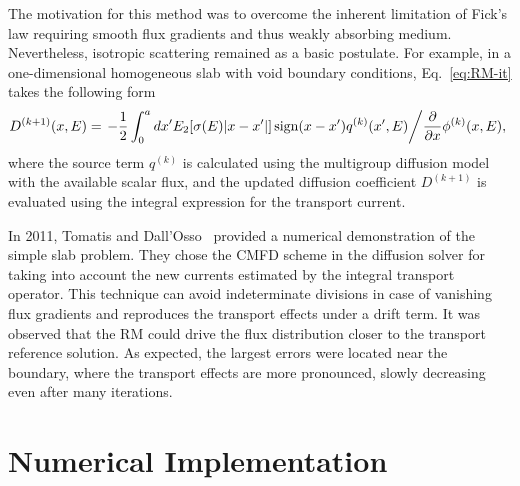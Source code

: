 The motivation for this method was to overcome the inherent limitation of Fick's law requiring smooth flux gradients and thus weakly absorbing medium. Nevertheless, isotropic scattering remained as a basic postulate. For example, in a one-dimensional homogeneous slab with void boundary conditions, Eq.~\eqref{eq:RM-it} takes the following form~\cite{Ronen-2004}
\begin{equation}
  \label{eq:RM-it-1D-slab}
  D^{(k+1)}(x,E) = \left. -\frac{1}{2} \int_0^a dx'
    {E_2[\sigma(E) \lvert x-x' \rvert]\operatorname{sign}(x-x')q^{(k)}(x',E)}
    \middle/ \frac{\partial}{\partial x}\phi^{(k)}(x,E),\right.
\end{equation}
where the source term $q^{(k)}$ is calculated using the multigroup diffusion model with the available scalar flux, and the updated diffusion coefficient $D^{(k+1)}$ is evaluated using the integral expression for the transport current.

In 2011, Tomatis and Dall'Osso~\cite{Tomatis-2011} provided a numerical demonstration of the simple slab problem. They chose the CMFD scheme in the diffusion solver for taking into account the new currents estimated by the integral transport operator.
%
%
This technique can avoid indeterminate divisions in case of vanishing flux gradients and reproduces the transport effects under a drift term. It was observed that the RM could drive the flux distribution closer to the transport reference solution. As expected, the largest errors were located near the boundary, where the transport effects are more pronounced, slowly decreasing even after many iterations.%


\section{Numerical Implementation}
\label{sec:RM-num}

